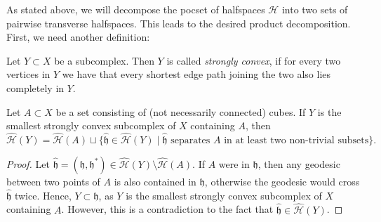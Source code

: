 As stated above, we will decompose the pocset of halfspaces \(\mathcal{H}\) into two sets of pairwise transverse halfspaces. This leads to the desired product decomposition. First, we need another definition:

\begin{defin}
  Let \(Y \subset X\) be a subcomplex. Then \(Y\) is called \emph{strongly convex}, if for every two vertices in \(Y\) we have that every shortest edge path joining the two also lies completely in \(Y\).
\end{defin}

\begin{lemma}[{\cite[Lemma~4.16]{MR3509968}}]
  \label{lem:4.16}
  Let \(A \subset X\) be a set consisting of (not necessarily connected) cubes. If \(Y\) is the smallest strongly convex subcomplex of \(X\) containing \(A\), then
  \[
    \mathcal{\hat H}(Y) = \mathcal{\hat H}(A) \sqcup \{\mathfrak{\hat h} \in \mathcal{\hat H}(Y) \mid \mathfrak{\hat h} \text{ separates } A \text{ in at least two non-trivial subsets}\}.
  \]
\end{lemma}

\begin{proof}
  Let \(\mathfrak{\hat h} = (\mathfrak{h}, \mathfrak{h}^\ast) \in \mathcal{\hat H}(Y) \setminus \mathcal{\hat H}(A)\). If \(A\) were in \(\mathfrak{h}\), then any geodesic between two points of \(A\) is also contained in \(\mathfrak{h}\), otherwise the geodesic would cross \(\mathfrak{\hat h}\) twice. Hence, \(Y \subset \mathfrak{h}\), as \(Y\) is the smallest strongly convex subcomplex of \(X\) containing \(A\). However, this is a contradiction to the fact that \(\mathfrak{\hat h} \in \mathcal{\hat H}(Y)\).
\end{proof}

